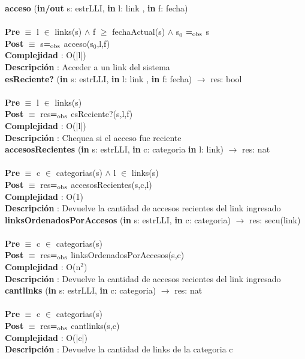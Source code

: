	\textbf{acceso} (\textbf{in/out} s: estrLLI, \textbf{in} l: link , \textbf{in} f: fecha) \\\\
	\textbf{Pre} $\equiv$ {l $\in$ links(s) $\wedge$ f $\geq$ fechaActual(s) $\wedge$ s${_0}$ $=_{\mathrm{obs}}$ s}\\
	\textbf{Post} $\equiv$ {s$=_{\mathrm{obs}}$ acceso(s${_0}$,l,f)}\\
	\textbf{Complejidad} : O(|l|)\\
	\textbf{Descripci\'{o}n} : Acceder a un link del sistema\\
		
	\textbf{esReciente?} (\textbf{in} s: estrLLI, \textbf{in} l: link , \textbf{in} f: fecha) $\longrightarrow$ res: bool\\\\
	\textbf{Pre} $\equiv$ {l $\in$ links(s)}\\
	\textbf{Post} $\equiv$ {res$=_{\mathrm{obs}}$ esReciente?(s,l,f)}\\
	\textbf{Complejidad} : O(|l|)\\
	\textbf{Descripci\'{o}n} : Chequea si el acceso fue reciente\\
	
	\textbf{accesosRecientes} (\textbf{in} s: estrLLI, \textbf{in} c: categoria \textbf{in} l: link) $\longrightarrow$ res: nat\\\\
	\textbf{Pre} $\equiv$ {c $\in$ categorias(s) $\wedge$ l $\in$ links(s)}\\
	\textbf{Post} $\equiv$ {res$=_{\mathrm{obs}}$ accesosRecientes(s,c,l)}\\
	\textbf{Complejidad} : O(1)\\
	\textbf{Descripci\'{o}n} : Devuelve la cantidad de accesos recientes del link ingresado\\
	
	\textbf{linksOrdenadosPorAccesos} (\textbf{in} s: estrLLI, \textbf{in} c: categoria) $\longrightarrow$ res: secu(link)\\\\
	\textbf{Pre} $\equiv$ {c $\in$ categorias(s)}\\
	\textbf{Post} $\equiv$ {res$=_{\mathrm{obs}}$ linksOrdenadosPorAccesos(s,c)}\\
	\textbf{Complejidad} : O(n${^2}$)\\
	\textbf{Descripci\'{o}n} : Devuelve la cantidad de accesos recientes del link ingresado\\
	
	\textbf{cantlinks} (\textbf{in} s: estrLLI, \textbf{in} c: categoria) $\longrightarrow$ res: nat\\\\
	\textbf{Pre} $\equiv$ {c $\in$ categorias(s)}\\
	\textbf{Post} $\equiv$ {res$=_{\mathrm{obs}}$ cantlinks(s,c)}\\
	\textbf{Complejidad} : O(|c|)\\
	\textbf{Descripci\'{o}n} : Devuelve la cantidad de links de la categoria c\\
	
